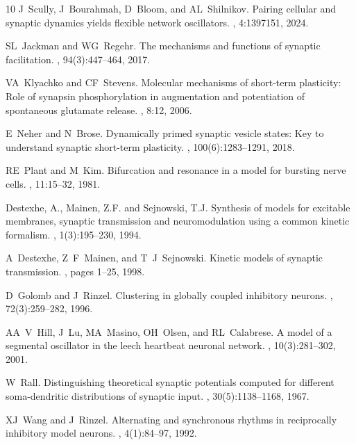 \documentclass[nofootinbib,aip,amsmath,amssymb,preprint,twocolumn,floatfix,10pt]{revtex4-2}
\begin{document}
\begin{thebibliography}{10}
J~Scully, J~Bourahmah, D~Bloom, and AL~Shilnikov.
\newblock Pairing cellular and synaptic dynamics yields flexible network oscillators.
, 4:1397151, 2024.

SL~Jackman and WG~Regehr.
\newblock The mechanisms and functions of synaptic facilitation.
, 94(3):447--464, 2017.

VA~Klyachko and CF~Stevens.
\newblock Molecular mechanisms of short-term plasticity: Role of synapsin phosphorylation in augmentation and potentiation of spontaneous glutamate release.
, 8:12, 2006.

E~Neher and N~Brose.
\newblock Dynamically primed synaptic vesicle states: Key to understand synaptic short-term plasticity.
, 100(6):1283--1291, 2018.

RE~Plant and M~Kim.
\newblock Bifurcation and resonance in a model for bursting nerve cells.
, 11:15--32, 1981.

Destexhe, A., Mainen, Z.F. and Sejnowski, T.J.
\newblock Synthesis of models for excitable membranes, synaptic transmission and neuromodulation using a common kinetic formalism.
, 1(3):195--230, 1994.

A~Destexhe, Z~F~Mainen, and T~J~Sejnowski.
\newblock Kinetic models of synaptic transmission.
, pages 1--25, 1998.

D~Golomb and J~Rinzel.
\newblock Clustering in globally coupled inhibitory neurons.
, 72(3):259--282, 1996.

AA~V~Hill, J~Lu, MA~Masino, OH~Olsen, and RL~Calabrese.
\newblock A model of a segmental oscillator in the leech heartbeat neuronal network.
, 10(3):281--302, 2001.

W~Rall.
\newblock Distinguishing theoretical synaptic potentials computed for different soma-dendritic distributions of synaptic input.
, 30(5):1138--1168, 1967.

XJ~Wang and J~Rinzel.
\newblock Alternating and synchronous rhythms in reciprocally inhibitory model neurons.
, 4(1):84--97, 1992.


\end{thebibliography}
\end{document}
